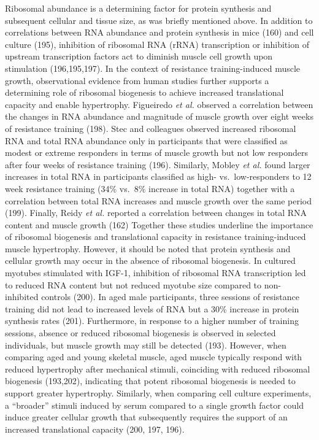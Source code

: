 \documentclass[twoside,10pt]{gihclass} %
\begin{document}
Ribosomal abundance is a determining factor for protein synthesis and subsequent cellular and tissue size, as was briefly mentioned above.
In addition to correlations between RNA abundance and protein synthesis in mice
(160)
and cell culture
(195),
inhibition of ribosomal RNA (rRNA) transcription or inhibition of upstream transcription factors act to diminish muscle cell growth upon stimulation
(196,195,197).
In the context of resistance training-induced muscle growth, observational evidence from human studies further supports a determining role of ribosomal biogenesis to achieve increased translational capacity and enable hypertrophy.
Figueiredo \emph{et al.} observed a correlation between the changes in RNA abundance and magnitude of muscle growth over eight weeks of resistance training
(198).
Stec and colleagues observed increased ribosomal RNA and total RNA abundance only in participants that were classified as modest or extreme responders in terms of muscle growth but not low responders after four weeks of resistance training
(196).
Similarly, Mobley \emph{et al.} found larger increases in total RNA in participants classified as high- vs.~low-responders to 12 week resistance training (34\% vs.~8\% increase in total RNA) together with a correlation between total RNA increases and muscle growth over the same period
(199).
Finally, Reidy \emph{et al.} reported a correlation between changes in total RNA content and muscle growth
(162)
Together these studies underline the importance of ribosomal biogenesis and translational capacity in resistance training-induced muscle hypertrophy.
However, it should be noted that protein synthesis and cellular growth may occur in the absence of ribosomal biogenesis.
In cultured myotubes stimulated with IGF-1, inhibition of ribosomal RNA transcription led to reduced RNA content but not reduced myotube size compared to non-inhibited controls
(200).
In aged male participants, three sessions of resistance training did not lead to increased levels of RNA but a 30\% increase in protein synthesis rates
(201).
Furthermore, in response to a higher number of training sessions, absence or reduced ribosomal biogenesis is observed in selected individuals, but muscle growth may still be detected
(193).
However, when comparing aged and young skeletal muscle, aged muscle typically respond with reduced hypertrophy after mechanical stimuli, coinciding with reduced ribosomal biogenesis
(193,202),
indicating that potent ribosomal biogenesis is needed to support greater hypertrophy.
Similarly, when comparing cell culture experiments, a ``broader'' stimuli induced by serum compared to a single growth factor could induce greater cellular growth that subsequently requires the support of an increased translational capacity
(200, 197, 196).
\end{document}
